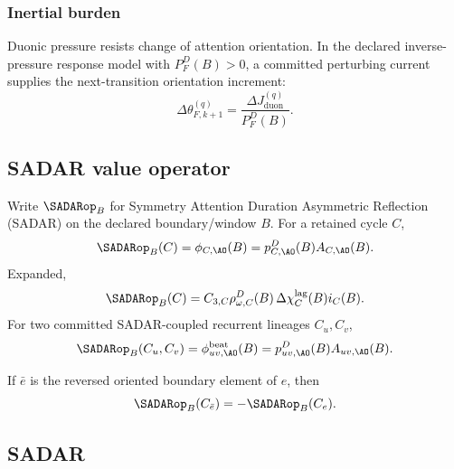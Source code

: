 \subsubsection{Inertial burden}
\label{subsec:inertial-burden}
Duonic pressure resists change of attention orientation. In the declared inverse-pressure response model with \(P^D_F(B)>0\), a committed perturbing current supplies the next-transition orientation increment:
\[
\Delta\theta_{F,k+1}^{(q)}=
\frac{\Delta J_{\mathrm{duon}}^{(q)}}{P^D_F(B)}.
\]




\subsection{SADAR value operator}
\label{subsec:sadar-operator}
\begin{definition}
Write \(\SADARop_B\) for Symmetry Attention Duration Asymmetric Reflection (SADAR) on the declared boundary/window \(B\). For a retained cycle \(C\),
\begin{equation}
\SADARop_B(C)
=
\phi_{C,\AO}(B)
=
p^D_{C,\AO}(B)A_{C,\AO}(B).
\label{eq:sadar-operator-cycle}
\end{equation}
Expanded,
\begin{equation}
\SADARop_B(C)
=
C_{3,C}\rho^D_{\omega,C}(B)\,\Delta\chi_C^{\mathrm{lag}}(B)i_C(B).
\label{eq:sadar-operator-expanded}
\end{equation}
For two committed SADAR-coupled recurrent lineages \(C_u,C_v\),
\begin{equation}
\SADARop_B(C_u,C_v)
=
\phi^{\mathrm{beat}}_{uv,\AO}(B)
=
p^D_{uv,\AO}(B)A_{uv,\AO}(B).
\label{eq:sadar-operator-beat-coupling}
\end{equation}
\end{definition}
If \(\bar e\) is the reversed oriented boundary element of \(e\), then
\begin{equation}
\SADARop_B(C_{\bar e})=-\SADARop_B(C_e).
\label{eq:sadar-orientation-antisymmetry}
\end{equation}


\subsection{SADAR}
\label{sec:field:sadar}
\label{subsec:sadar}

